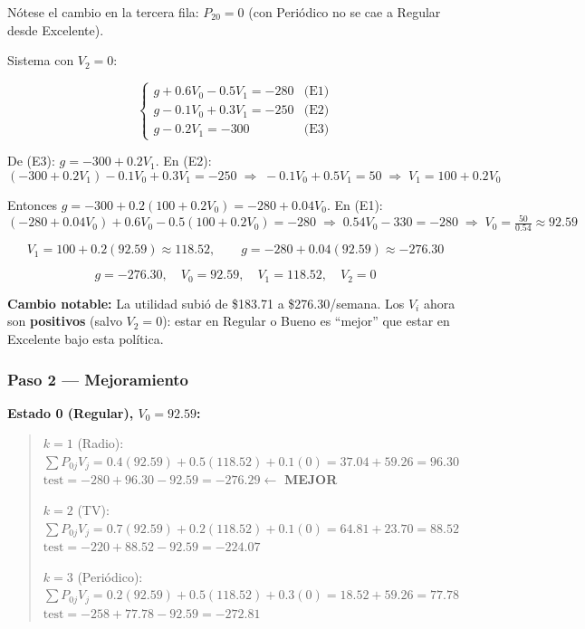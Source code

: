 \documentclass[12pt,a4paper]{article}
\begin{document}
Nótese el cambio en la tercera fila: $P_{20}=0$ (con Periódico no se cae a Regular desde Excelente).

Sistema con $V_2 = 0$:

\[
\boxed{\begin{cases}
g + 0.6V_0 - 0.5V_1 = -280 & \text{(E1)}\\[4pt]
g - 0.1V_0 + 0.3V_1 = -250 & \text{(E2)}\\[4pt]
g - 0.2V_1 = -300 & \text{(E3)}
\end{cases}}
\]

De (E3): $g = -300 + 0.2V_1$. En (E2):
\[
(-300 + 0.2V_1) - 0.1V_0 + 0.3V_1 = -250
\;\Longrightarrow\; -0.1V_0 + 0.5V_1 = 50
\;\Longrightarrow\; \boxed{V_1 = 100 + 0.2V_0}
\]

Entonces $g = -300 + 0.2(100 + 0.2V_0) = -280 + 0.04V_0$. En (E1):
\[
(-280 + 0.04V_0) + 0.6V_0 - 0.5(100 + 0.2V_0) = -280
\;\Longrightarrow\; 0.54V_0 - 330 = -280
\;\Longrightarrow\; \boxed{V_0 = \tfrac{50}{0.54} \approx 92.59}
\]

\[
V_1 = 100 + 0.2(92.59) \approx 118.52,\qquad
g = -280 + 0.04(92.59) \approx -276.30
\]

\[
\boxed{ \boxed{ g = -276.30,\quad V_0 = 92.59,\quad V_1 = 118.52,\quad V_2 = 0 } }
\]

\textbf{Cambio notable:} La utilidad subió de \$183.71 a \$276.30/semana. Los $V_i$ ahora son \textbf{positivos} (salvo $V_2=0$): estar en Regular o Bueno es ``mejor'' que estar en Excelente bajo esta política.

\subsubsection*{Paso 2 --- Mejoramiento}

\textbf{Estado 0 (Regular), $V_0 = 92.59$:}

\begin{quote}\footnotesize
$k=1$ (Radio):\;
$\sum P_{0j}V_j = 0.4(92.59) + 0.5(118.52) + 0.1(0) = 37.04 + 59.26 = 96.30$ \\
\hspace*{1.8cm} $\text{test} = -280 + 96.30 - 92.59 = \mathbf{-276.29}$\quad $\leftarrow$ \textbf{MEJOR}

\vspace{4pt}
$k=2$ (TV):\;
$\sum P_{0j}V_j = 0.7(92.59) + 0.2(118.52) + 0.1(0) = 64.81 + 23.70 = 88.52$ \\
\hspace*{1.8cm} $\text{test} = -220 + 88.52 - 92.59 = -224.07$

\vspace{4pt}
$k=3$ (Periódico):\;
$\sum P_{0j}V_j = 0.2(92.59) + 0.5(118.52) + 0.3(0) = 18.52 + 59.26 = 77.78$ \\
\hspace*{1.8cm} $\text{test} = -258 + 77.78 - 92.59 = -272.81$
\end{quote}
\end{document}
